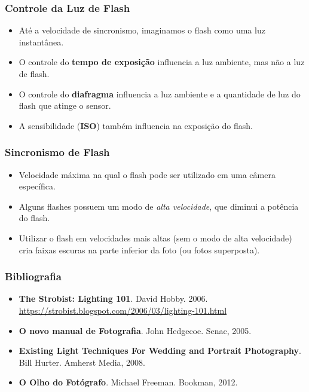 
\begin{frame}
  \frametitle{Controle da Luz de Flash}
  \begin{itemize}
      \item Até a velocidade de sincronismo, imaginamos o flash como uma luz instantânea.
      \item O controle do \textbf{tempo de exposição} influencia a luz ambiente, mas não
      a luz de flash.
      \item O controle do \textbf{diafragma} influencia a luz ambiente e a quantidade de
      luz do flash que atinge o sensor.
      \item A sensibilidade (\textbf{ISO}) também influencia na exposição do flash.
  \end{itemize}
\end{frame}

\begin{frame}
  \frametitle{Sincronismo de Flash}
  \begin{itemize}
      \item Velocidade máxima na qual o flash pode ser utilizado em uma câmera
      específica.
      \item Alguns flashes possuem um modo de \textit{alta velocidade}, que diminui
      a potência do flash.
      \item Utilizar o flash em velocidades mais altas (sem o modo de alta velocidade)
      cria faixas escuras na parte inferior da foto (ou fotos superposta).
  \end{itemize}
\end{frame}



\begin{frame}
    \frametitle{Bibliografia}
    \begin{itemize}
        \item \textbf{The Strobist: Lighting 101}. David Hobby. 2006.
        \hspace{2cm} \url{https://strobist.blogspot.com/2006/03/lighting-101.html}
        \item \textbf{O novo manual de Fotografia}. John Hedgecoe. Senac, 2005.
        \item \textbf{Existing Light Techniques For Wedding and Portrait Photography}.
        Bill Hurter. Amherst Media, 2008.
        \item \textbf{O Olho do Fotógrafo}. Michael Freeman. Bookman, 2012.
    \end{itemize}
\end{frame}


